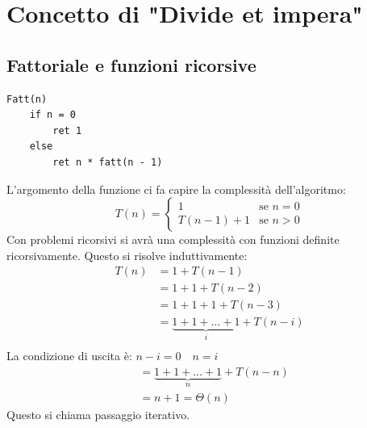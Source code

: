 \documentclass[a4paper]{article}
\begin{document}
\section{Concetto di "Divide et impera"}

\subsection{Fattoriale e funzioni ricorsive}

\begin{lstlisting}
Fatt(n)
    if n = 0
        ret 1
    else
        ret n * fatt(n - 1)
\end{lstlisting}

L'argomento della funzione ci fa capire la complessità dell'algoritmo:
\[
  T(n) = \begin{cases}
    1 & \text{se } n = 0 \\
    T(n - 1) + 1 & \text{se } n > 0
  \end{cases}
\]
Con problemi ricorsivi si avrà una complessità con funzioni definite ricorsivamente.
Questo si risolve induttivamente:
\[
  \begin{aligned}
    T(n) & = 1 + T(n-1)\\
         & = 1 + 1 + T(n-2)\\
         & = 1 + 1 + 1 + T(n-3)\\
         & = \underbrace{1 + 1 + \ldots + 1}_{i} + T(n-i)\\
  \end{aligned}
\]
La condizione di uscita è: \( n-i = 0 \quad n = i \)
\[
\begin{aligned}
         & = \underbrace{1 + 1 + \ldots + 1}_{n} + T(n-n)\\
         & = n + 1 = \Theta(n)
\end{aligned}
\]
Questo si chiama passaggio iterativo.
\end{document}
